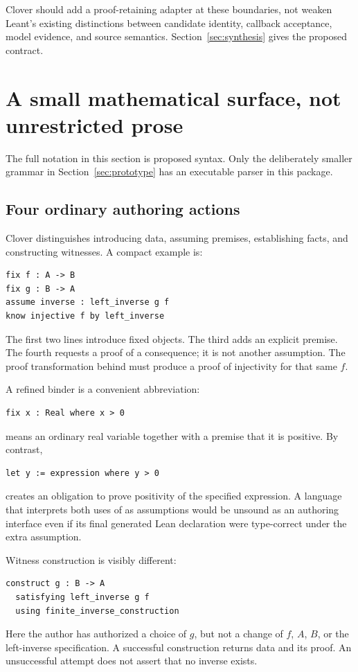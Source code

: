 \documentclass[11pt,a4paper]{article}
\newcommand{\code}[1]{\texttt{\detokenize{#1}}}
\theoremstyle{definition}
\theoremstyle{remark}
\begin{document}
Clover should add a proof-retaining adapter at these boundaries, not weaken
Leant's existing distinctions between candidate identity, callback acceptance,
model evidence, and source semantics. Section~\ref{sec:synthesis} gives the
proposed contract.

\section{A small mathematical surface, not unrestricted prose}\label{sec:surface}

The full notation in this section is proposed syntax. Only the deliberately
smaller grammar in Section~\ref{sec:prototype} has an executable parser in this
package.

\subsection{Four ordinary authoring actions}

Clover distinguishes introducing data, assuming premises, establishing facts,
and constructing witnesses. A compact example is:
\begin{lstlisting}
fix f : A -> B
fix g : B -> A
assume inverse : left_inverse g f
know injective f by left_inverse
\end{lstlisting}
The first two lines introduce fixed objects. The third adds an explicit premise.
The fourth requests a proof of a consequence; it is not another assumption.
The proof transformation behind \code{by left_inverse} must produce a proof
of injectivity for that same $f$.

A refined binder is a convenient abbreviation:
\begin{lstlisting}
fix x : Real where x > 0
\end{lstlisting}
means an ordinary real variable together with a premise that it is positive.
By contrast,
\begin{lstlisting}
let y := expression where y > 0
\end{lstlisting}
creates an obligation to prove positivity of the specified expression. A
language that interprets both uses of \code{where} as assumptions would be
unsound as an authoring interface even if its final generated Lean declaration
were type-correct under the extra assumption.

Witness construction is visibly different:
\begin{lstlisting}
construct g : B -> A
  satisfying left_inverse g f
  using finite_inverse_construction
\end{lstlisting}
Here the author has authorized a choice of $g$, but not a change of $f$, $A$,
$B$, or the left-inverse specification. A successful construction returns data
and its proof. An unsuccessful attempt does not assert that no inverse exists.
\end{document}
